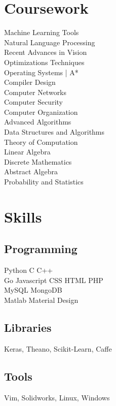 \documentclass[]{deedy-resume-openfont}
\begin{document}
\begin{minipage}[t]{0.33\textwidth}
\section{Coursework}
Machine Learning Tools \\
Natural Language Processing \\
Recent Advances in Vision \\
Optimizations Techniques \\
Operating Systems | A* \\
Compiler Design \\
Computer Networks \\ 
Computer Security \\

Computer Organization \\
Advanced Algorithms \\
Data Structures and Algorithms \\
Theory of Computation \\

Linear Algebra \\
Discrete Mathematics \\
Abstract Algebra \\
Probability and Statistics \\


\sectionsep


\section{Skills}
\subsection{Programming}
Python \textbullet{} C \textbullet{} C++ \\
Go \textbullet{} Javascript \textbullet{} CSS \textbullet{} HTML \textbullet{} PHP \\
MySQL \textbullet{} MongoDB \\
Matlab \textbullet Material Design 
\sectionsep

\subsection{Libraries}
Keras, Theano, Scikit-Learn, Caffe
\sectionsep

\subsection{Tools}
Vim, Solidworks, Linux, Windows
\sectionsep


%
%

\end{minipage} 
\end{document}
